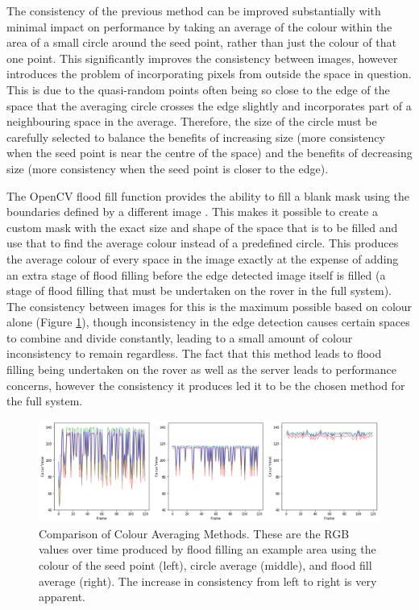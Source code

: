The consistency of the previous method can be improved substantially with minimal impact on performance by taking an average of the colour within the area of a small circle around the seed point, rather than just the colour of that one point. This significantly improves the consistency between images, however introduces the problem of incorporating pixels from outside the space in question. This is due to the quasi-random points often being so close to the edge of the space that the averaging circle crosses the edge slightly and incorporates part of a neighbouring space in the average. Therefore, the size of the circle must be carefully selected to balance the benefits of increasing size (more consistency when the seed point is near the centre of the space) and the benefits of decreasing size (more consistency when the seed point is closer to the edge). 

The OpenCV flood fill function provides the ability to fill a blank mask using the boundaries defined by a different image \cite{bradski2008learning}. This makes it possible to create a custom mask with the exact size and shape of the space that is to be filled and use that to find the average colour instead of a predefined circle. This produces the average colour of every space in the image exactly at the expense of adding an extra stage of flood filling before the edge detected image itself is filled (a stage of flood filling that must be undertaken on the rover in the full system). The consistency between images for this is the maximum possible based on colour alone (Figure \ref{fig:ColourConsistency}), though inconsistency in the edge detection causes certain spaces to combine and divide constantly, leading to a small amount of colour inconsistency to remain regardless. The fact that this method leads to flood filling being undertaken on the rover as well as the server leads to performance concerns, however the consistency it produces led it to be the chosen method for the full system.

\begin{figure}[H]
    \begin{center}
      \includegraphics[width=1\textwidth]{Figures/ColourConsistency.png}
      \caption[Comparison of Colour Averaging Methods]{Comparison of Colour Averaging Methods. These are the RGB values over time produced by flood filling an example area using the colour of the seed point (left), circle average (middle), and flood fill average (right). The increase in consistency from left to right is very apparent.}
      \label{fig:ColourConsistency}
    \end{center}
\end{figure}